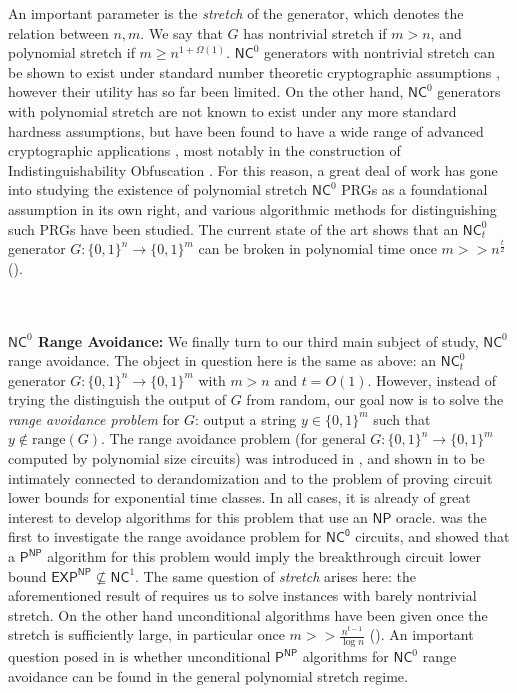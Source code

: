 \documentclass[11pt]{article}
\newcommand{\B}{\{0,1\}}
\newcommand{\rng}{\mathrm{range}}
\begin{document}
An important parameter is the \emph{stretch} of the generator, which denotes the relation between $n,m$. We say that $G$ has nontrivial stretch if $m >n$, and polynomial stretch if $m \geq n^{1+\Omega(1)}$. $\mathsf{NC}^0$ generators with nontrivial stretch can be shown to exist under standard number theoretic cryptographic assumptions \cite{randomized-encodings}, however their utility has so far been limited. On the other hand, $\mathsf{NC}^0$ generators with polynomial stretch are not known to exist under any more standard hardness assumptions, but have been found to have a wide range of advanced cryptographic applications \cite{ishai2008cryptography}, most notably in the construction of Indistinguishability Obfuscation \cite{jls1,jls2}. For this reason, a great deal of work has gone into studying the existence of polynomial stretch $\mathsf{NC}^0$ PRGs as a foundational assumption in its own right, and various algorithmic methods for distinguishing such PRGs have been studied. The current state of the art shows that an $\mathsf{NC}_t^0$ generator $G: \B^n \to \B^m$ can be broken in polynomial time once $m >> n^{\frac{t}{2}}$ (\cite{mossel-epsilon,aow,semirandom}).

~\\~\\
{\bf \noindent $\mathsf{NC}^0$ Range Avoidance:}
We finally turn to our third main subject of study, $\mathsf{NC}^0$ range avoidance. The object in question here is the same as above: an $\mathsf{NC}^0_t$ generator $G: \B^n \to \B^m$ with $m >n$ and $t = O(1)$. However, instead of trying the distinguish the output of $G$ from random, our goal now is to solve the \emph{range avoidance problem} for $G$: output a string $y \in \B^m$ such that $y \notin \rng(G)$. The range avoidance problem (for general $G: \B^n \to \B^m$ computed by polynomial size circuits) was introduced in \cite{KKMP}, and shown in \cite{Korten} to be intimately connected to derandomization and to the problem of proving circuit lower bounds for exponential time classes. In all cases, it is already of great interest to develop algorithms for this problem that use an $\mathsf{NP}$ oracle. \cite{RSW} was the first to investigate the range avoidance problem for $\mathsf{NC^0}$ circuits, and showed that a $\mathsf{P^{NP}}$ algorithm for this problem would imply the breakthrough circuit lower bound $\mathsf{EXP^{NP}} \not\subseteq \mathsf{NC}^1$. The same question of \emph{stretch} arises here: the aforementioned result of \cite{RSW} requires us to solve instances with barely nontrivial stretch. On the other hand unconditional algorithms have been given once the stretch is sufficiently large, in particular once $m >> \frac{n^{t-1}}{\log n}$ (\cite{guruswami2022range,karthik}). An important question posed in \cite{RSW} is whether unconditional $\mathsf{P^{NP}}$ algorithms for $\mathsf{NC}^0$ range avoidance can be found in the general polynomial stretch regime.
\end{document}

